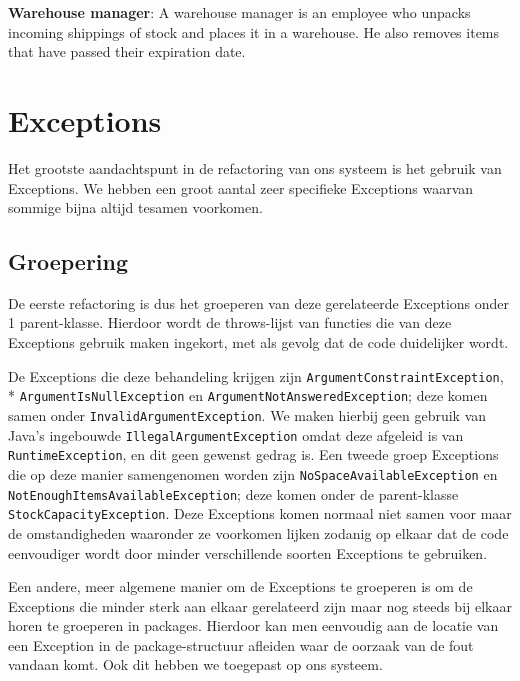 \documentclass[a4paper]{article}
\begin{document}
\textbf{Warehouse manager}: A warehouse manager is an employee who unpacks incoming shippings of stock and places it in {\color{red}a} warehouse. He also removes items that have passed their expiration date.



\section{Exceptions}
Het grootste aandachtspunt in de refactoring van ons systeem is het gebruik van Exceptions. We hebben een groot aantal zeer specifieke Exceptions waarvan sommige bijna altijd tesamen voorkomen.
\subsection{Groepering}
De eerste refactoring is dus het groeperen van deze gerelateerde Exceptions onder 1 parent-klasse. Hierdoor wordt de throws-lijst van functies die van deze Exceptions gebruik maken ingekort, met als gevolg dat de code duidelijker wordt.

De Exceptions die deze behandeling krijgen zijn \texttt{ArgumentConstraintException},\\* \texttt{ArgumentIsNullException} en \texttt{ArgumentNotAnsweredException}; deze komen samen onder  \texttt{InvalidArgumentException}. We maken hierbij geen gebruik van Java's ingebouwde \texttt{IllegalArgumentException} omdat deze afgeleid is van \texttt{RuntimeException}, en dit geen gewenst gedrag is. Een tweede groep Exceptions die op deze manier samengenomen worden zijn \texttt{NoSpaceAvailableException} en \texttt{NotEnoughItemsAvailableException}; deze komen onder de parent-klasse \texttt{StockCapacityException}. Deze Exceptions komen normaal niet samen voor maar de omstandigheden waaronder ze voorkomen lijken zodanig op elkaar dat de code eenvoudiger wordt door minder verschillende soorten Exceptions te gebruiken.

Een andere, meer algemene manier om de Exceptions te groeperen is om de Exceptions die minder sterk aan elkaar gerelateerd zijn maar nog steeds bij elkaar horen te groeperen in packages. Hierdoor kan men eenvoudig aan de locatie van een Exception in de package-structuur afleiden waar de oorzaak van de fout vandaan komt. Ook dit hebben we toegepast op ons systeem.
\end{document}
